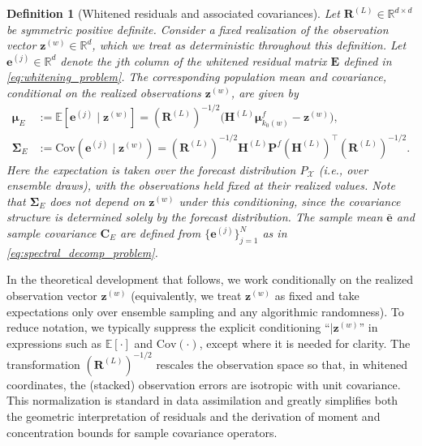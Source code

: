 \documentclass[11pt,a4paper]{article}
\newtheorem{definition}{Definition}
\begin{document}
\begin{definition}[Whitened residuals and associated covariances]
\label{def:whitened_residual_covariances}
Let $\mathbf{R}^{(L)}\in\mathbb{R}^{d\times d}$ be symmetric positive definite. Consider a fixed realization of the observation vector $\mathbf{z}^{(w)}\in\mathbb{R}^{d}$, which we treat as deterministic throughout this definition. Let $\mathbf{e}^{(j)}\in\mathbb{R}^{d}$ denote the $j$th column of the whitened residual matrix $\mathbf{E}$ defined in \eqref{eq:whitening_problem}. The corresponding population mean and covariance, conditional on the realized observations $\mathbf{z}^{(w)}$, are given by
\begin{align*}
	\boldsymbol{\mu}_E
	&:=
	\mathbb{E}[\mathbf{e}^{(j)}\mid\mathbf{z}^{(w)}]
	=
	(\mathbf{R}^{(L)})^{-1/2}
	\bigl(\mathbf{H}^{(L)}\boldsymbol{\mu}_{k_0(w)}^{f}-\mathbf{z}^{(w)}\bigr),\\
\boldsymbol{\Sigma}_E
&:=
\mathrm{Cov}(\mathbf{e}^{(j)}\mid\mathbf{z}^{(w)})
=
(\mathbf{R}^{(L)})^{-1/2}
\mathbf{H}^{(L)}\mathbf{P}^{f}(\mathbf{H}^{(L)})^\top
(\mathbf{R}^{(L)})^{-1/2}.
\end{align*}
Here the expectation is taken over the forecast distribution $P_{\mathcal{X}}$ (i.e., over ensemble draws), with the observations held fixed at their realized values. Note that $\boldsymbol{\Sigma}_E$ does not depend on $\mathbf{z}^{(w)}$ under this conditioning, since the covariance structure is determined solely by the forecast distribution. The sample mean $\bar{\mathbf{e}}$ and sample covariance $\mathbf{C}_E$ are defined from $\{\mathbf{e}^{(j)}\}_{j=1}^N$ as in \eqref{eq:spectral_decomp_problem}.
\end{definition}
In the theoretical development that follows, we work conditionally on the realized observation vector $\mathbf{z}^{(w)}$ (equivalently, we treat $\mathbf{z}^{(w)}$ as fixed and take expectations only over ensemble sampling and any algorithmic randomness). To reduce notation, we typically suppress the explicit conditioning ``$\mid\mathbf{z}^{(w)}$'' in expressions such as $\mathbb{E}[\cdot]$ and $\mathrm{Cov}(\cdot)$, except where it is needed for clarity.
The transformation $(\mathbf{R}^{(L)})^{-1/2}$ rescales the observation space so that, in whitened coordinates, the (stacked) observation errors are isotropic with unit covariance. This normalization is standard in data assimilation and greatly simplifies both the geometric interpretation of residuals and the derivation of moment and concentration bounds for sample covariance operators.
\end{document}
